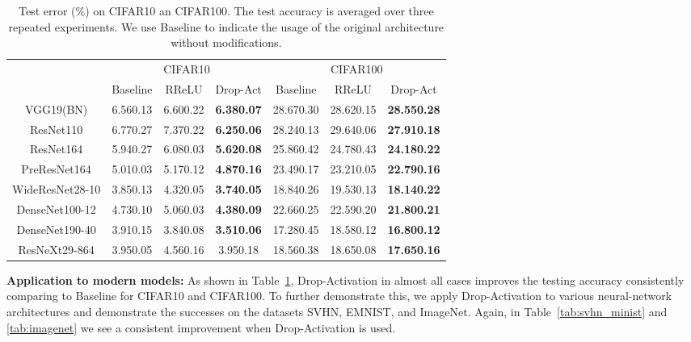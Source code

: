 \documentclass[11pt]{article}
\begin{document}
\begin{table}[htbp]
\small
  \centering
  
    \begin{tabular}{|c|c|c|c|c|c|c|}
    \toprule
          & \multicolumn{3}{c|}{CIFAR10} & \multicolumn{3}{c|}{CIFAR100} \\
\cmidrule{2-7}          & Baseline & RReLU & Drop-Act & Baseline & RReLU & Drop-Act \\
    \midrule
    VGG19(BN) & 6.560.13  & 6.600.22  & \textbf{6.380.07}  & 28.670.30     & 28.620.15     & \textbf{28.550.28} \\
    ResNet110 & 6.770.27  & 7.370.22  & \textbf{6.250.06}  & 28.240.13     & 29.640.06     & \textbf{27.910.18} \\
    ResNet164 & 5.940.27     & 6.080.03     & \textbf{5.620.08}     & 25.860.42  & 24.780.43  & \textbf{24.180.22}  \\
    PreResNet164 & 5.010.03  & 5.170.12  & \textbf{4.870.16}  & 23.490.17  & 23.210.05  & \textbf{22.790.16}  \\
    WideResNet28-10 & 3.850.13  & 4.320.05  & \textbf{3.740.05}  & 18.840.26  & 19.530.13  & \textbf{18.140.22}  \\
    DenseNet100-12 & 4.730.10  & 5.060.03  & \textbf{4.380.09}  & 22.660.25  & 22.590.20  & \textbf{21.800.21}  \\
    DenseNet190-40 & 3.910.15  &   3.840.08    & \textbf{3.510.06}  & 17.280.45   &   18.580.12    & \textbf{16.800.12}  \\
    ResNeXt29-864 & 3.950.05  & 4.560.16  & 3.950.18  & 18.560.38  & 18.650.08  & \textbf{17.650.16}  \\
    \bottomrule
    \end{tabular}

  \caption{Test error (\%) on CIFAR10 an CIFAR100. The test accuracy is averaged over three repeated experiments. We use Baseline to indicate the usage of the original architecture without modifications.}
  \label{tab:c100}
  \vspace{-0.5cm}
\end{table}

\textbf{Application to modern models:} As shown in Table~\ref{tab:c100}, Drop-Activation in almost all cases improves the testing accuracy consistently comparing to Baseline for CIFAR10 and CIFAR100. To further demonstrate this, we apply Drop-Activation to various neural-network architectures and demonstrate the successes on the datasets SVHN, EMNIST, and ImageNet. Again, in Table~\ref{tab:svhn_minist} and \ref{tab:imagenet} we see a consistent improvement when Drop-Activation is used. 
\end{document}
